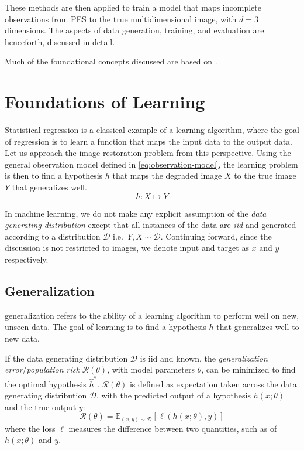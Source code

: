 These methods are then applied to train a model that maps incomplete  observations from \gls{PES} to the true multidimensional image, with $d=3$ dimensions. The aspects of data generation, training, and evaluation are henceforth, discussed in detail.

Much of the foundational concepts discussed are based on \cite{shalev-shwartzUnderstandingMachineLearning2014a,jamesIntroductionStatisticalLearning2013,tibshiraniElementsStatisticalLearning,goodfellowDeepLearning2016}.

\section{Foundations of Learning}
Statistical regression is a classical example of a learning algorithm, where the goal of regression is to learn a function that maps the input data to the output data.
Let us approach the image restoration problem from this perspective. Using the general observation model defined in \cref{eq:observation-model}, the learning problem is then to find a hypothesis $h$ that maps the degraded image $X$ to the true image $Y$ that generalizes well.
\begin{equation}
    h: X \mapsto Y
\end{equation}

In machine learning, we do not make any explicit assumption of the \textit{data generating distribution} except that all instances of the data are \textit{\gls{iid}} and generated according to a distribution $\mathcal{D}$ i.e.\ $Y, X \sim \mathcal{D}$. Continuing forward, since the discussion is not restricted to images, we denote input and target as $x$ and $y$ respectively. 

\subsection{Generalization}\label{sec:generalization}
\Gls{generalization} refers to the ability of a learning algorithm to perform well on new, unseen data. The goal of learning is to find a hypothesis $h$ that generalizes well to new data. 

If the data generating distribution $\mathcal{D}$ is \gls{iid} and known, the \textit{generalization error}/\textit{population risk} $\mathcal{R}(\theta)$, with model parameters $\theta$, can be minimized to find the optimal hypothesis $\hat{h}^*$. $\mathcal{R}(\theta)$ is defined as expectation taken across the data generating distribution $\mathcal{D}$, with the predicted output of a hypothesis $h(x; \theta)$ and the true output $y$:
\begin{equation}\label{eq:risk}
    \mathcal{R}(\theta) = \mathbb{E}_{(x, y) \sim \mathcal{D}} \left[ \ell(h(x; \theta), y) \right]
\end{equation}
where the loss $\ell$ measures the difference between two quantities, such as of $h(x; \theta)$ and $y$.

